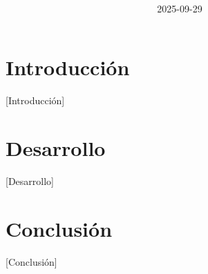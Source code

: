 \documentclass[12pt]{article}
\title{\textbf{}}
\author{ \\ }
\date{2025-09-29}
\begin{document}
\maketitle

\section*{Introducción}
[Introducción]

\section*{Desarrollo}
[Desarrollo]

\section*{Conclusión}
[Conclusión]

\printbibliography[title={Referencias}]
\end{document}
